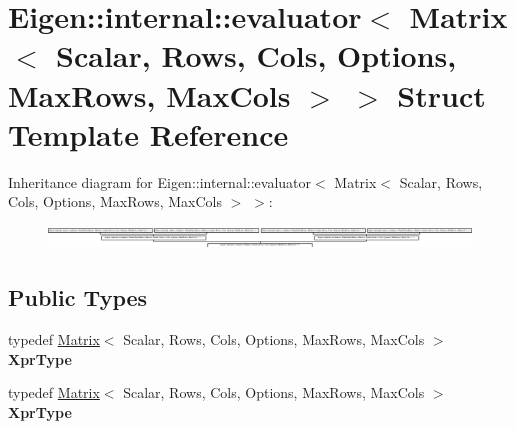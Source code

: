 \hypertarget{struct_eigen_1_1internal_1_1evaluator_3_01_matrix_3_01_scalar_00_01_rows_00_01_cols_00_01_optionc8e41d58a4f0b7a4fe2e5592b375183d}{}\section{Eigen\+:\+:internal\+:\+:evaluator$<$ Matrix$<$ Scalar, Rows, Cols, Options, Max\+Rows, Max\+Cols $>$ $>$ Struct Template Reference}
\label{struct_eigen_1_1internal_1_1evaluator_3_01_matrix_3_01_scalar_00_01_rows_00_01_cols_00_01_optionc8e41d58a4f0b7a4fe2e5592b375183d}
Inheritance diagram for Eigen\+:\+:internal\+:\+:evaluator$<$ Matrix$<$ Scalar, Rows, Cols, Options, Max\+Rows, Max\+Cols $>$ $>$\+:\begin{figure}[H]
\begin{center}
\leavevmode
\includegraphics[height=0.615836cm]{struct_eigen_1_1internal_1_1evaluator_3_01_matrix_3_01_scalar_00_01_rows_00_01_cols_00_01_optionc8e41d58a4f0b7a4fe2e5592b375183d}
\end{center}
\end{figure}
\subsection*{Public Types}
\begin{DoxyCompactItemize}
\item 
\mbox{\label{struct_eigen_1_1internal_1_1evaluator_3_01_matrix_3_01_scalar_00_01_rows_00_01_cols_00_01_optionc8e41d58a4f0b7a4fe2e5592b375183d_a298aded1f8f4a52612b203103c96a142}} 
typedef \hyperlink{group___core___module_class_eigen_1_1_matrix}{Matrix}$<$ Scalar, Rows, Cols, Options, Max\+Rows, Max\+Cols $>$ {\bfseries Xpr\+Type}
\item 
\mbox{\label{struct_eigen_1_1internal_1_1evaluator_3_01_matrix_3_01_scalar_00_01_rows_00_01_cols_00_01_optionc8e41d58a4f0b7a4fe2e5592b375183d_a298aded1f8f4a52612b203103c96a142}} 
typedef \hyperlink{group___core___module_class_eigen_1_1_matrix}{Matrix}$<$ Scalar, Rows, Cols, Options, Max\+Rows, Max\+Cols $>$ {\bfseries Xpr\+Type}
\end{DoxyCompactItemize}
